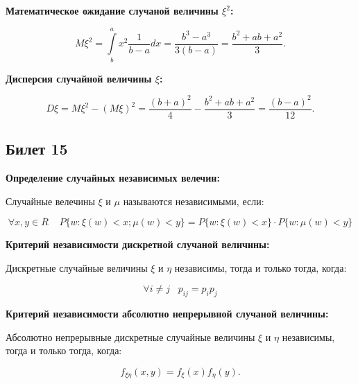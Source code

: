 \textbf{Математическое ожидание случаной величины $\xi^2$:}
\smallskip

\[
    M\xi^2 = \int\limits^a_b x^2 \frac{1}{b - a}dx = 
    \frac{b^3 - a^3}{3(b - a)} = \frac{b^2 + ab + a^2}{3}.  
\]
\bigskip

\textbf{Дисперсия случайной величины $\xi$:}
\smallskip

\[
    D\xi = M\xi^2 - (M\xi)^2 = \frac{(b + a)^2}{4} -
    \frac{b^2 + ab + a^2}{3} = \frac{(b - a)^2}{12}.  
\]
\bigskip

\subsection{Билет 15}

\textbf{Определение случайных независимых
велечин:}
\smallskip

Случайные велечины $\xi$ и $\mu$ называются
независимыми, если:

\[ 
    \forall x, y \in R \;\;\;\; P\{w : \xi(w)
    < x; \mu (w) < y\} = P\{w: \xi (w) < x\} \cdot
    P\{w : \mu (w) < y\}
\]
\bigskip

\textbf{Критерий независимости дискретной случаной величины:}
\smallskip

Дискретные случайные величины $\xi$ и $\eta$ независимы, тогда
и только тогда, когда:

\[
    \forall i \neq j \;\;\; p_{ij} = p_i p_j  
\]
\bigskip

\textbf{Критерий независимости абсолютно непрерывной случаной величины:}
\smallskip

Абсолютно непрерывные дискретные случайные величины $\xi$ и
$\eta$ независимы, тогда и только тогда, когда:

\[
    f_{\xi \eta}(x, y) = f_{\xi} (x) f_{\eta} (y). 
\]    

        
